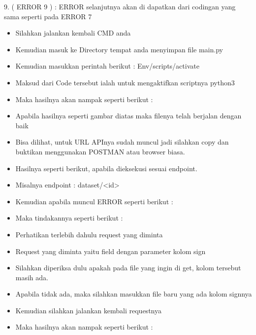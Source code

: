 9. ( ERROR 9 ) : 
ERROR selanjutnya akan di dapatkan dari codingan yang sama seperti pada ERROR 7 
\begin{itemize}
\item Silahkan jalankan kembali CMD anda 
\item Kemudian masuk ke Directory tempat anda menyimpan file main.py 
\item Kemudian masukkan perintah berikut : Env/scripts/activate 
\item Maksud dari Code tersebut ialah untuk mengaktifkan scriptnya python3 
\item Maka hasilnya akan nampak seperti berikut : 
\item Apabila hasilnya seperti gambar diatas maka filenya telah berjalan dengan baik 
\item Bisa dilihat, untuk URL APInya sudah muncul jadi silahkan copy dan buktikan menggunakan POSTMAN atau browser biasa. 
\item Hasilnya seperti berikut, apabila dieksekusi sesuai endpoint. 
\item Misalnya endpoint : dataset/<id> 
\item Kemudian apabila muncul ERROR seperti berikut : 
\item Maka tindakannya seperti berikut : 
\item Perhatikan terlebih dahulu request yang diminta 
\item Request yang diminta yaitu field dengan parameter kolom sign 
\item Silahkan diperiksa dulu apakah pada file yang ingin di get, kolom tersebut masih ada. 
\item Apabila tidak ada, maka silahkan masukkan file baru yang ada kolom signnya 
\item Kemudian silahkan jalankan kembali requestnya 
\item Maka hasilnya akan nampak seperti berikut : 
\end{itemize}


